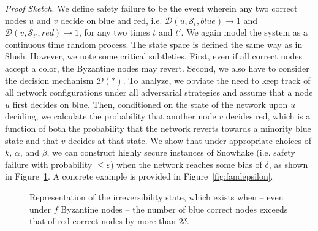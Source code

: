 \documentclass[letterpaper,twocolumn,10pt]{article}
\theoremstyle{definition}
\begin{document}
\noindent \emph{Proof Sketch}. We define safety failure to be the event wherein any two correct nodes $u$ and $v$ decide on blue and red, i.e. $\mathcal{D}(u, \mathcal{S}_t, blue) \rightarrow 1$ and $\mathcal{D}(v, \mathcal{S}_{t'}, red) \rightarrow 1$, for any two times $t$ and $t'$. We again model the system as a continuous time random process. The state space is defined the same way as in Slush. However, we note some critical subtleties. First, even if all correct nodes accept a color, the Byzantine nodes may revert. Second, we also have to consider the decision mechanism $\mathcal{D}(*)$. To analyze, we obviate the need to keep track of all network configurations under all adversarial strategies and assume that a node $u$ first decides on blue. Then, conditioned on the state of the network upon $u$ deciding, we calculate the probability that another node $v$ decides red, which is a function of both the probability that the network reverts towards a minority blue state and that $v$ decides at that state. 
We show that under appropriate choices of $k$, $\alpha$, and $\beta$, we can construct highly secure instances of Snowflake (i.e. safety failure with probability $\leq \varepsilon$) when the network reaches some bias of $\delta$, as shown in Figure~\ref{fig:states_feasible_solutions}. A concrete example is provided in Figure~\ref{fig:fandepsilon}.

\begin{figure}[h]
\begin{center}

\caption{Representation of the irreversibility state, which exists when -- even under $f$ Byzantine nodes -- the number of blue correct nodes exceeds that of red correct nodes by more than $2\delta$.
}
\label{fig:states_feasible_solutions}
\end{center}
\end{figure}    

\end{document}
